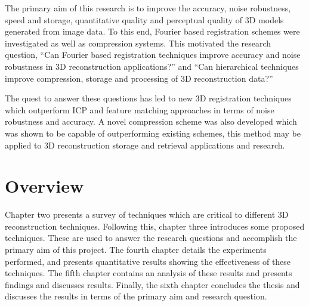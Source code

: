 The primary aim of this research is to improve the accuracy, noise robustness, speed and storage, quantitative quality and perceptual quality of 3D models generated from image data. To this end, Fourier based registration schemes were investigated as well as compression systems. This motivated the research question, ``Can Fourier based registration techniques improve accuracy and noise robustness in 3D reconstruction applications?'' and ``Can hierarchical techniques improve compression, storage and processing of 3D reconstruction data?'' 

The quest to answer these questions has led to new 3D registration techniques \cite{Lincoln16Fourier,Lincoln16Dense,Lincoln16Monocular} which outperform ICP and feature matching approaches in terms of noise robustness and accuracy. A novel compression scheme was also developed \cite{Lincoln13Interpolating,Lincoln15Plane} which was shown to be capable of outperforming existing schemes, this method may be applied to 3D reconstruction storage and retrieval applications and research.

\section{Overview}

Chapter two presents a survey of techniques which are critical to different 3D reconstruction techniques. Following this, chapter three introduces some proposed techniques. These are used to answer the research questions and accomplish the primary aim of this project. The fourth chapter details the experiments performed, and presents quantitative results showing the effectiveness of these techniques. The fifth chapter contains an analysis of these results and presents findings and discusses results. Finally, the sixth chapter concludes the thesis and discusses the results in terms of the primary aim and research question. 


